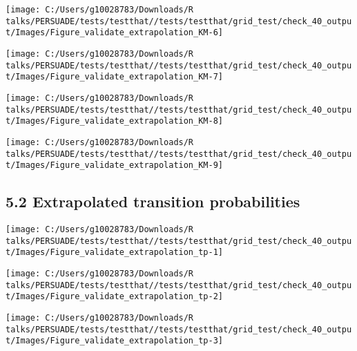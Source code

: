 \documentclass[
]{article}
\begin{document}
\begin{flushleft}\texttt{[image: C:/Users/g10028783/Downloads/R talks/PERSUADE/tests/testthat//tests/testthat/grid\_test/check\_40\_output/Images/Figure\_validate\_extrapolation\_KM-6]} \end{flushleft}

\begin{flushleft}\texttt{[image: C:/Users/g10028783/Downloads/R talks/PERSUADE/tests/testthat//tests/testthat/grid\_test/check\_40\_output/Images/Figure\_validate\_extrapolation\_KM-7]} \end{flushleft}

\begin{flushleft}\texttt{[image: C:/Users/g10028783/Downloads/R talks/PERSUADE/tests/testthat//tests/testthat/grid\_test/check\_40\_output/Images/Figure\_validate\_extrapolation\_KM-8]} \end{flushleft}

\begin{flushleft}\texttt{[image: C:/Users/g10028783/Downloads/R talks/PERSUADE/tests/testthat//tests/testthat/grid\_test/check\_40\_output/Images/Figure\_validate\_extrapolation\_KM-9]} \end{flushleft}

\clearpage

\subsection{5.2 Extrapolated transition
probabilities}\label{extrapolated-transition-probabilities}

\begin{flushleft}\texttt{[image: C:/Users/g10028783/Downloads/R talks/PERSUADE/tests/testthat//tests/testthat/grid\_test/check\_40\_output/Images/Figure\_validate\_extrapolation\_tp-1]} \end{flushleft}

\begin{flushleft}\texttt{[image: C:/Users/g10028783/Downloads/R talks/PERSUADE/tests/testthat//tests/testthat/grid\_test/check\_40\_output/Images/Figure\_validate\_extrapolation\_tp-2]} \end{flushleft}

\begin{flushleft}\texttt{[image: C:/Users/g10028783/Downloads/R talks/PERSUADE/tests/testthat//tests/testthat/grid\_test/check\_40\_output/Images/Figure\_validate\_extrapolation\_tp-3]} \end{flushleft}
\end{document}
